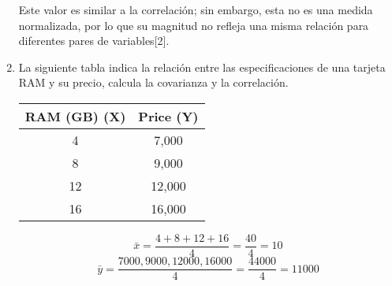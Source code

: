 \documentclass[]{article}
\begin{document}
\begin{enumerate}
    Este valor es similar a la correlación; sin embargo, esta no es una medida normalizada, por lo que 
    su magnitud no refleja una misma relación para diferentes pares de variables[2].
    
    \item La siguiente tabla indica la relación entre las especificaciones de una tarjeta RAM y su
    precio, calcula la covarianza y la correlación.

    \begin{center}
        \begin{tabular}[]{| c | c |}
            \hline
            RAM (GB) (X) & Price (Y)\\
            \hline
            4 & 7,000 \\
            8 & 9,000 \\
            12 & 12,000 \\
            16 & 16,000 \\
            \hline
        \end{tabular}
    \end{center}

    $$\bar{x} = \frac{4 + 8 + 12 + 16}{4} = \frac{40}{4} = 10$$
    $$\bar{y} = \frac{7000, 9000, 12000, 16000}{4} = \frac{44000}{4} = 11000$$


\end{enumerate}
\end{document}
